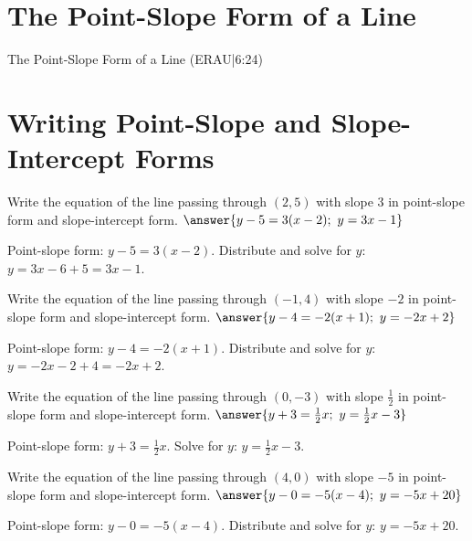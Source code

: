 \documentclass{ximera}
\begin{document}

\section*{The Point-Slope Form of a Line}

The Point-Slope Form of a Line (ERAU|6:24)


\section*{Writing Point-Slope and Slope-Intercept Forms}

\begin{problem}
Write the equation of the line passing through $(2, 5)$ with slope $3$ in point-slope form and slope-intercept form. $\answer{y - 5 = 3(x - 2);\ y = 3x - 1}$
\begin{feedback}
Point-slope form: $y - 5 = 3(x - 2)$. Distribute and solve for $y$: $y = 3x - 6 + 5 = 3x - 1$.
\end{feedback}
\end{problem}

\begin{problem}
Write the equation of the line passing through $(-1, 4)$ with slope $-2$ in point-slope form and slope-intercept form. $\answer{y - 4 = -2(x + 1);\ y = -2x + 2}$
\begin{feedback}
Point-slope form: $y - 4 = -2(x + 1)$. Distribute and solve for $y$: $y = -2x - 2 + 4 = -2x + 2$.
\end{feedback}
\end{problem}

\begin{problem}
Write the equation of the line passing through $(0, -3)$ with slope $\frac{1}{2}$ in point-slope form and slope-intercept form. $\answer{y + 3 = \frac{1}{2}x;\ y = \frac{1}{2}x - 3}$
\begin{feedback}
Point-slope form: $y + 3 = \frac{1}{2}x$. Solve for $y$: $y = \frac{1}{2}x - 3$.
\end{feedback}
\end{problem}

\begin{problem}
Write the equation of the line passing through $(4, 0)$ with slope $-5$ in point-slope form and slope-intercept form. $\answer{y - 0 = -5(x - 4);\ y = -5x + 20}$
\begin{feedback}
Point-slope form: $y - 0 = -5(x - 4)$. Distribute and solve for $y$: $y = -5x + 20$.
\end{feedback}
\end{problem}
\end{document}
